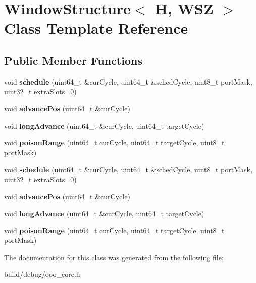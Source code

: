 \hypertarget{classWindowStructure}{\section{Window\-Structure$<$ H, W\-S\-Z $>$ Class Template Reference}
\label{classWindowStructure}
}
\subsection*{Public Member Functions}
\begin{DoxyCompactItemize}
\item 
\hypertarget{classWindowStructure_a5fbb851ff77e797c76e76516733a249c}{void {\bfseries schedule} (uint64\-\_\-t \&cur\-Cycle, uint64\-\_\-t \&sched\-Cycle, uint8\-\_\-t port\-Mask, uint32\-\_\-t extra\-Slots=0)}\label{classWindowStructure_a5fbb851ff77e797c76e76516733a249c}

\item 
\hypertarget{classWindowStructure_ac5f7ce8a6a107ea5fca4038add8d2a48}{void {\bfseries advance\-Pos} (uint64\-\_\-t \&cur\-Cycle)}\label{classWindowStructure_ac5f7ce8a6a107ea5fca4038add8d2a48}

\item 
\hypertarget{classWindowStructure_a1cc12f308688ba1fdf56d53b6b60237f}{void {\bfseries long\-Advance} (uint64\-\_\-t \&cur\-Cycle, uint64\-\_\-t target\-Cycle)}\label{classWindowStructure_a1cc12f308688ba1fdf56d53b6b60237f}

\item 
\hypertarget{classWindowStructure_a9ac13aa6980ecce3bc1eb1de86fe57b7}{void {\bfseries poison\-Range} (uint64\-\_\-t cur\-Cycle, uint64\-\_\-t target\-Cycle, uint8\-\_\-t port\-Mask)}\label{classWindowStructure_a9ac13aa6980ecce3bc1eb1de86fe57b7}

\item 
\hypertarget{classWindowStructure_a5fbb851ff77e797c76e76516733a249c}{void {\bfseries schedule} (uint64\-\_\-t \&cur\-Cycle, uint64\-\_\-t \&sched\-Cycle, uint8\-\_\-t port\-Mask, uint32\-\_\-t extra\-Slots=0)}\label{classWindowStructure_a5fbb851ff77e797c76e76516733a249c}

\item 
\hypertarget{classWindowStructure_ac5f7ce8a6a107ea5fca4038add8d2a48}{void {\bfseries advance\-Pos} (uint64\-\_\-t \&cur\-Cycle)}\label{classWindowStructure_ac5f7ce8a6a107ea5fca4038add8d2a48}

\item 
\hypertarget{classWindowStructure_a1cc12f308688ba1fdf56d53b6b60237f}{void {\bfseries long\-Advance} (uint64\-\_\-t \&cur\-Cycle, uint64\-\_\-t target\-Cycle)}\label{classWindowStructure_a1cc12f308688ba1fdf56d53b6b60237f}

\item 
\hypertarget{classWindowStructure_a9ac13aa6980ecce3bc1eb1de86fe57b7}{void {\bfseries poison\-Range} (uint64\-\_\-t cur\-Cycle, uint64\-\_\-t target\-Cycle, uint8\-\_\-t port\-Mask)}\label{classWindowStructure_a9ac13aa6980ecce3bc1eb1de86fe57b7}

\end{DoxyCompactItemize}


The documentation for this class was generated from the following file\-:\begin{DoxyCompactItemize}
\item 
build/debug/ooo\-\_\-core.\-h\end{DoxyCompactItemize}
